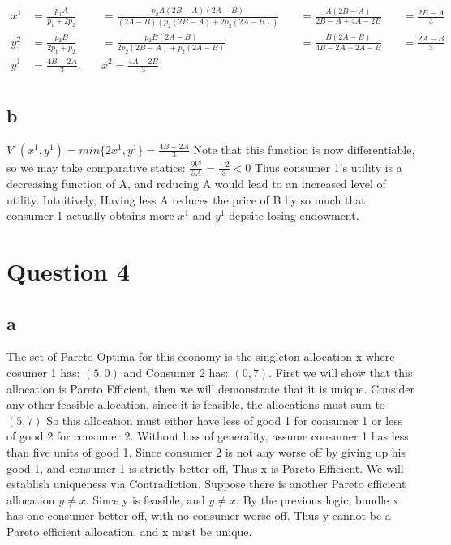 \documentclass[10pt, letterpaper]{paper}
\begin{document}
\begin{equation*}
\begin{alignedat}{8}
x^1 &= \frac{ p_1 A }{ p_1 + 2p_2 } &= \frac{ p_2 A ( 2B - A) (2A-B)}{(2A -B)(p_2 (2B-A) + 2p_2 (2A - B) )} \quad &= \frac{ A( 2B - A)}{ 2B - A + 4A - 2B} \quad &= \frac{ 2B - A }{3}\\
y^2 &= \frac{ p_2 B }{ 2p_1 + p_2 } &=\frac{ p_2 B (2A- B)}{ 2p_2 (2B - A) + p_2 (2A - B) } &= \frac{ B( 2A - B)}{4B - 2A + 2A - B} &=\frac{ 2A -B}{3}\\
y^1 &= \frac{ 4B - 2A }{3} . \quad &x^2 = \frac{ 4A - 2B}{3}  & & \\
\end{alignedat}
\end{equation*}


\subsection*{b}
$V^1( x^1, y^1 ) = min\{ 2x^1, y^1 \} = \frac{ 4B - 2A }{3}$ 
\newline
Note that this function is now differentiable, so we may take comparative statics:
\newline
$\frac{ \partial V^1 }{ \partial A } = \frac{ -2 }{3} < 0$
Thus consumer 1's utility is a decreasing function of A, and reducing A would lead to an increased level of utility.
Intuitively, Having less A reduces the price of B by so much that consumer 1 actually obtains more $x^1$ and $y^1$ depsite losing endowment.

\section*{Question 4}
\subsection*{a}
The set of Pareto Optima for this economy is the singleton allocation x where cosumer 1 has: $(5,0)$ and Consumer 2 has: $(0,7)$. First we will show that this allocation is Pareto Efficient, then we will demonstrate that it is unique.
Consider any other feasible allocation, since it is feasible, the allocations must sum to $(5,7)$
So this allocation must either have less of good 1 for consumer 1 or less of good 2 for consumer 2.
Without loss of generality, assume consumer 1 has less than five units of good 1. Since consumer 2 is
not any worse off by giving up his good 1, and consumer 1 is strictly better off, Thus x is Pareto Efficient.
\newline
We will establish uniqueness via Contradiction. Suppose there is another Pareto efficient allocation $y \neq x$.
Since y is feasible, and $y \neq x$, By the previous logic, bundle x has one consumer better off, with no consumer worse off.
Thus y cannot be a Pareto efficient allocation, and x must be unique.
\end{document}
